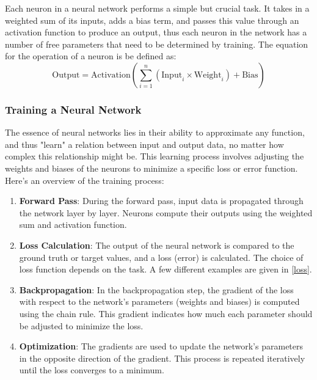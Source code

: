 Each neuron in a neural network performs a simple but crucial task. It takes in a weighted sum of its inputs, adds a bias term, and passes this value through an activation function to produce an output, thus each neuron in the network has a number of free parameters that need to be determined by training. The equation for the operation of a neuron is be defined as:
\begin{equation}
	\text{Output} = \text{Activation}\left(\sum_{i=1}^{n} (\text{Input}_i \times \text{Weight}_i) + \text{Bias}\right)
\end{equation}

\subsubsection{Training a Neural Network}

The essence of neural networks lies in their ability to approximate any function, and thus "learn" a relation between input and output data, no matter how complex this relationship might be. This learning process involves adjusting the weights and biases of the neurons to minimize a specific loss or error function. Here's an overview of the training process:

\begin{enumerate}
	\item \textbf{Forward Pass}: During the forward pass, input data is propagated through the network layer by layer. Neurons compute their outputs using the weighted sum and activation function.
	
	\item \textbf{Loss Calculation}: The output of the neural network is compared to the ground truth or target values, and a loss (error) is calculated. The choice of loss function depends on the task. A few different examples are given in \ref{loss}.
	
	\item \textbf{Backpropagation}: In the backpropagation step, the gradient of the loss with respect to the network's parameters (weights and biases) is computed using the chain rule. This gradient indicates how much each parameter should be adjusted to minimize the loss.
	
	\item \textbf{Optimization}: The gradients are used to update the network's parameters in the opposite direction of the gradient. This process is repeated iteratively until the loss converges to a minimum.
\end{enumerate}

